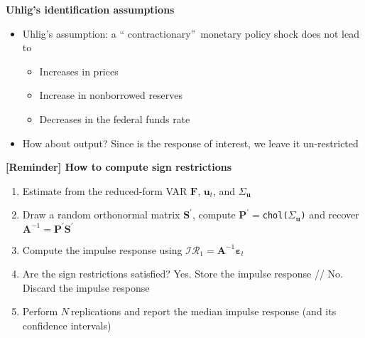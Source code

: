 \documentclass[10pt,handout]{beamer}
\begin{document}
\begin{frame}
{\textbf{Uhlig's identification assumptions}}

\begin{itemize}
\item Uhlig's assumption: a \textquotedblleft
contractionary\textquotedblright\ monetary policy shock does not lead to

\begin{itemize}
\item Increases in prices

\item Increase in nonborrowed reserves

\item Decreases in the federal funds rate\medskip \pause
\end{itemize}

\item How about output? Since is the response of interest, we leave it
un-restricted
\end{itemize}
\end{frame}

\vspace{.1cm}

\begin{frame}
{\textbf{[Reminder] How to compute sign restrictions}}

\begin{enumerate}
\item Estimate from the reduced-form VAR $\mathbf{F}$, ${\mathbf{u}_{t}}$,
and $\Sigma _{\mathbf{u}}$\medskip \pause

\item Draw a random orthonormal matrix $\mathbf{S}^{\prime }$, compute $%
\mathbf{P}^{\prime }=$\texttt{chol(}$\Sigma _{\mathbf{u}}$\texttt{)} and
recover $\mathbf{A}^{-1}=\mathbf{P}^{\prime }\mathbf{S}^{\prime }$\medskip 
\pause

\item Compute the impulse response using $\mathcal{IR}_{1}=\mathbf{A}^{-1}%
\mathbf{\varepsilon }_{t}$\medskip\ \pause

\item Are the sign restrictions satisfied? Yes. Store the impulse response
// No. Discard the impulse response\medskip \pause

\item Perform $N\ $replications and report the median impulse response (and
its confidence intervals)
\end{enumerate}
\end{frame}
\end{document}
